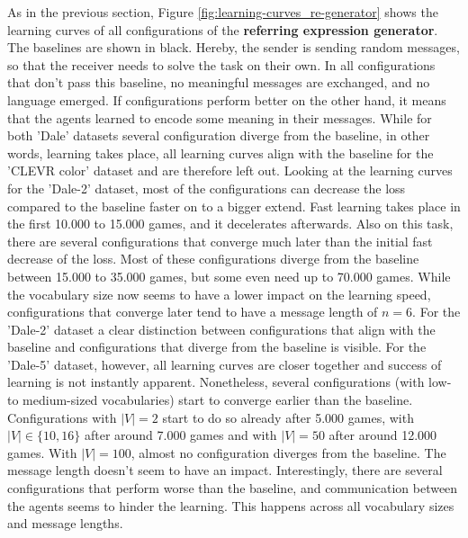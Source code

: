 As in the previous section, Figure \ref{fig:learning-curves_re-generator} shows the learning curves of all configurations of the \textbf{referring expression generator}.
The baselines are shown in black.
Hereby, the sender is sending random messages, so that the receiver needs to solve the task on their own.
In all configurations that don't pass this baseline, no meaningful messages are exchanged, and no language emerged.
If configurations perform better on the other hand, it means that the agents learned to encode some meaning in their messages.
While for both 'Dale' datasets several configuration diverge from the baseline, in other words, learning takes place, all learning curves align with the baseline for the 'CLEVR color' dataset and are therefore left out.
Looking at the learning curves for the 'Dale-2' dataset, most of the configurations can decrease the loss compared to the baseline faster on to a bigger extend.
Fast learning takes place in the first 10.000 to 15.000 games, and it decelerates afterwards.
Also on this task, there are several configurations that converge much later than the initial fast decrease of the loss.
Most of these configurations diverge from the baseline between 15.000 to 35.000 games, but some even need up to 70.000 games.
While the vocabulary size now seems to have a lower impact on the learning speed, configurations that converge later tend to have a message length of $n=6$.
For the 'Dale-2' dataset a clear distinction between configurations that align with the baseline and configurations that diverge from the baseline is visible.
For the 'Dale-5' dataset, however, all learning curves are closer together and success of learning is not instantly apparent.
Nonetheless, several configurations (with low- to medium-sized vocabularies) start to converge earlier than the baseline.
Configurations with $|V|=2$ start to do so already after 5.000 games, with $|V|\in\{10,16\}$ after around 7.000 games and with $|V|=50$ after around 12.000 games.
With $|V|=100$, almost no configuration diverges from the baseline.
The message length doesn't seem to have an impact.
Interestingly, there are several configurations that perform worse than the baseline, and communication between the agents seems to hinder the learning.
This happens across all vocabulary sizes and message lengths.

